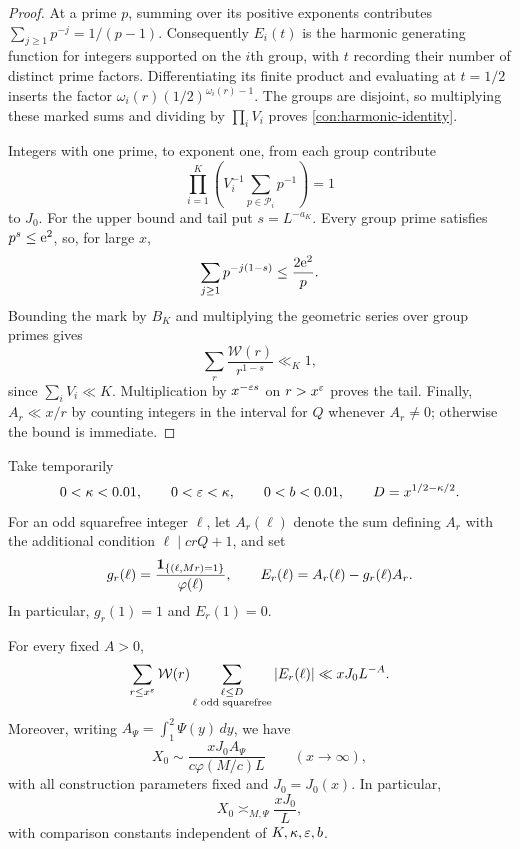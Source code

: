 \begin{proof}
At a prime \(p\), summing over its positive exponents contributes
\(\sum_{j\ge1}p^{-j}=1/(p-1)\). Consequently \(E_i(t)\) is the
harmonic generating function for integers supported on the \(i\)th
group, with \(t\) recording their number of distinct prime factors.
Differentiating its finite product and
evaluating at \(t=1/2\) inserts the factor
\(\omega_i(r)(1/2)^{\omega_i(r)-1}\).
The groups are disjoint, so multiplying these marked sums and
dividing by \(\prod_iV_i\) proves \eqref{con:harmonic-identity}.

Integers with one prime, to exponent one, from each group contribute
\[
 \prod_{i=1}^K\left(V_i^{-1}\sum_{p\in\mathcal P_i}p^{-1}\right)=1
\]
to \(J_0\). For the upper bound and tail put \(s=L^{-a_K}\).
Every group prime satisfies \(p^s\le\mathrm{e}^2\), so, for large \(x\),
\[
 \sum_{j\ge1}p^{-j(1-s)}\le\frac{2\mathrm{e}^2}{p}.
\]
Bounding the mark by \(B_K\) and multiplying the geometric series
over group primes gives
\[
 \sum_r\frac{\mathcal W(r)}{r^{1-s}}\ll_K1,
\]
since \(\sum_iV_i\ll K\).  Multiplication by
\(x^{-\varepsilon s}\) on \(r>x^\varepsilon\) proves the tail.  Finally,
\(A_r\ll x/r\) by counting integers in the interval for \(Q\)
whenever \(A_r\ne0\); otherwise the bound is immediate.
\end{proof}

Take temporarily
\begin{equation}\label{con:small-parameters}
 0<\kappa<0.01,\qquad 0<\varepsilon<\kappa,
 \qquad 0<b<0.01,
 \qquad D=x^{1/2-\kappa/2}.
\end{equation}
For an odd squarefree integer \(\ell\), let \(A_r(\ell)\) denote
the sum defining \(A_r\) with the additional condition
\(\ell\mid crQ+1\), and set
\begin{equation}\label{con:local-density}
 g_r(\ell)=\frac{\mathbf{1}_{\{(\ell,Mr)=1\}}}{\varphi(\ell)},\qquad
 E_r(\ell)=A_r(\ell)-g_r(\ell)A_r.
\end{equation}
In particular, \(g_r(1)=1\) and \(E_r(1)=0\).

\begin{lemma}\label{con:distribution}
For every fixed \(A>0\),
\begin{equation}\label{con:bv-sum}
 \sum_{r\le x^\varepsilon}\mathcal W(r)
 \sum_{\substack{\ell\le D\\\ell\text{ odd squarefree}}}|E_r(\ell)|
       \ll xJ_0L^{-A}.
\end{equation}
Moreover, writing \(A_\Psi=\int_1^2\Psi(y)\,dy\), we have
\begin{equation}\label{con:mass-asymptotic}
 X_0\sim\frac{xJ_0A_\Psi}{c\varphi(M/c)L}
 \qquad(x\to\infty),
\end{equation}
with all construction parameters fixed and \(J_0=J_0(x)\).
In particular,
\begin{equation}\label{con:total-mass}
 X_0\asymp_{M,\Psi}\frac{xJ_0}{L},
\end{equation}
with comparison constants independent of \(K,\kappa,\varepsilon,b\).
\end{lemma}

